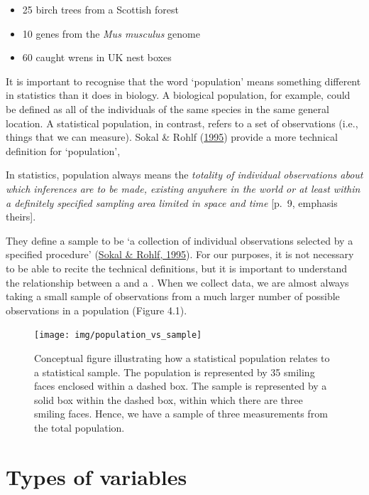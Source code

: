 \documentclass[
  openany]{krantz}
\providecommand{\tightlist}{%
  \setlength{\itemsep}{0pt}\setlength{\parskip}{0pt}}
\renewenvironment{quote}{\begin{VF}}{\end{VF}}
\begin{document}
\begin{itemize}
\tightlist
\item
  25 birch trees from a Scottish forest
\item
  10 genes from the \emph{Mus musculus} genome
\item
  60 caught wrens in UK nest boxes
\end{itemize}

It is important to recognise that the word `population' means something different in statistics than it does in biology.
A biological population, for example, could be defined as all of the individuals of the same species in the same general location.
A statistical population, in contrast, refers to a set of observations (i.e., things that we can measure).
Sokal \& Rohlf (\protect\hyperlink{ref-Sokal1995}{1995}) provide a more technical definition for `population',

\begin{quote}
In statistics, population always means the \emph{totality of individual observations about which inferences are to be made, existing anywhere in the world or at least within a definitely specified sampling area limited in space and time} {[}p.~9, emphasis theirs{]}.
\end{quote}

They define a sample to be `a collection of individual observations selected by a specified procedure' (\protect\hyperlink{ref-Sokal1995}{Sokal \& Rohlf, 1995}).
For our purposes, it is not necessary to be able to recite the technical definitions, but it is important to understand the relationship between a  and a .
When we collect data, we are almost always taking a small sample of observations from a much larger number of possible observations in a population (Figure 4.1).

\begin{figure}
\texttt{[image: img/population\_vs\_sample]} \caption{Conceptual figure illustrating how a statistical population relates to a statistical sample. The population is represented by 35 smiling faces enclosed within a dashed box. The sample is represented by a solid box within the dashed box, within which there are three smiling faces. Hence, we have a sample of three measurements from the total population.}\label{fig:unnamed-chunk-22}
\end{figure}

\hypertarget{Chapter_5}{%
\chapter{Types of variables}\label{Chapter_5}}
\end{document}
